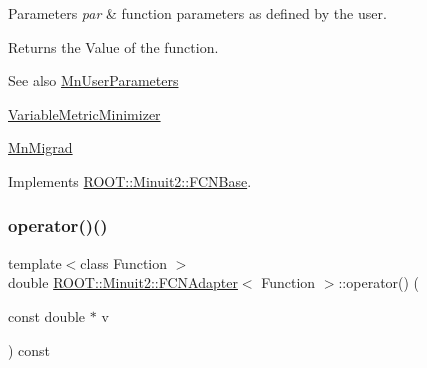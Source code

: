 \begin{DoxyParams}{Parameters}
{\em par} & function parameters as defined by the user.\\
\hline
\end{DoxyParams}
\begin{DoxyReturn}{Returns}
the Value of the function.
\end{DoxyReturn}
\begin{DoxySeeAlso}{See also}
\mbox{\hyperlink{classROOT_1_1Minuit2_1_1MnUserParameters}{Mn\+User\+Parameters}} 

\mbox{\hyperlink{classROOT_1_1Minuit2_1_1VariableMetricMinimizer}{Variable\+Metric\+Minimizer}} 

\mbox{\hyperlink{classROOT_1_1Minuit2_1_1MnMigrad}{Mn\+Migrad}} 
\end{DoxySeeAlso}


Implements \mbox{\hyperlink{classROOT_1_1Minuit2_1_1FCNBase_ae4a86bd94d0d0f5ca6fc8f8ab2bb43cd}{R\+O\+O\+T\+::\+Minuit2\+::\+F\+C\+N\+Base}}.

\mbox{\label{classROOT_1_1Minuit2_1_1FCNAdapter_a9321402d626f4bdfbdbef3b63d452daf}} 
\subsubsection{\texorpdfstring{operator()()}{operator()()}\hspace{0.1cm}{\footnotesize\ttfamily [3/4]}}
{\footnotesize\ttfamily template$<$class Function $>$ \\
double \mbox{\hyperlink{classROOT_1_1Minuit2_1_1FCNAdapter}{R\+O\+O\+T\+::\+Minuit2\+::\+F\+C\+N\+Adapter}}$<$ Function $>$\+::operator() (\begin{DoxyParamCaption}\item[{const double $\ast$}]{v }\end{DoxyParamCaption}) const\hspace{0.3cm}{\ttfamily [inline]}}

\mbox{\label{classROOT_1_1Minuit2_1_1FCNAdapter_a9321402d626f4bdfbdbef3b63d452daf}} 
